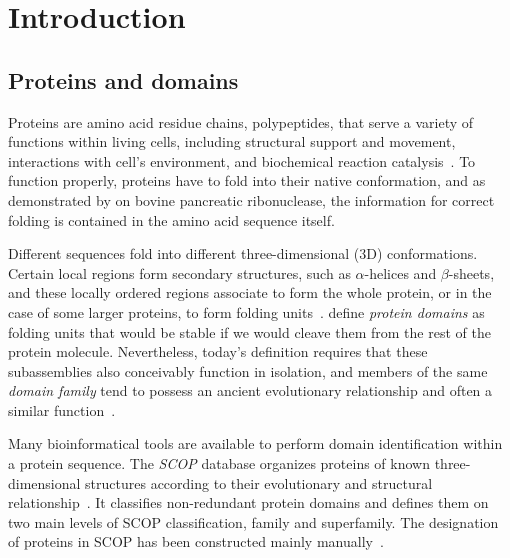 \chapter{Introduction}
\label{intro}

\section{Proteins and domains}
\label{intro:prodoms}

  Proteins are amino acid residue chains, polypeptides, that serve a variety of functions
  within living cells, including structural support and movement, interactions with cell's
  environment, and biochemical reaction catalysis~\cite{alberts2018molecular}.
  To function properly, proteins have to fold into their native conformation, and as
  demonstrated by \citet{anfinsen1961kinetics} on bovine pancreatic ribonuclease, the
  information for correct folding is contained in the amino acid sequence itself.

  Different sequences fold into different three-dimensional (3D) conformations.
  Certain local regions form secondary structures, such as $\alpha$-helices and
  $\beta$-sheets, and these locally ordered regions associate to form the whole protein,
  or in the case of some larger proteins, to form folding units~\cite{levitt1975computer}.
   define \emph{protein domains} as
  folding units that would be stable if we would cleave them from the rest of the protein
  molecule.
  Nevertheless, today's definition requires that these subassemblies also conceivably
  function in isolation, and members of the same \emph{domain family} tend to possess an
  ancient evolutionary relationship and often a similar
  function~\cite{ponting2002natural}.

  Many bioinformatical tools are available to perform domain identification within a
  protein sequence.
  The \emph{SCOP} database organizes proteins of known three-dimensional structures
  according to their evolutionary and structural relationship~\cite{murzin1995scop}.
  It classifies non-redundant protein domains and defines them on two main levels of SCOP
  classification, family and superfamily.
  The designation of proteins in SCOP has been constructed mainly
  manually~\cite{andreeva2020scop}.

